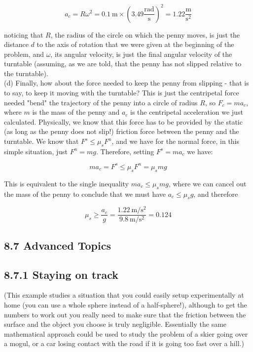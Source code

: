 \documentclass[10pt]{article}
\begin{document}
\begin{equation*}
a_{c}=R \omega^{2}=0.1 \mathrm{~m} \times\left(3.49 \frac{\mathrm{rad}}{\mathrm{s}}\right)^{2}=1.22 \frac{\mathrm{m}}{\mathrm{s}^{2}} \tag{8.43}
\end{equation*}


noticing that $R$, the radius of the circle on which the penny moves, is just the distance $d$ to the axis of rotation that we were given at the beginning of the problem, and $\omega$, its angular velocity, is just the final angular velocity of the turntable (assuming, as we are told, that the penny has not slipped relative to the turntable).\\
(d) Finally, how about the force needed to keep the penny from slipping - that is to say, to keep it moving with the turntable? This is just the centripetal force needed "bend" the trajectory of the penny into a circle of radius $R$, so $F_{c}=m a_{c}$, where $m$ is the mass of the penny and $a_{c}$ is the centripetal acceleration we just calculated. Physically, we know that this force has to be provided by the static (as long as the penny does not slip!) friction force between the penny and the turntable. We know that $F^{s} \leq \mu_{s} F^{n}$, and we have for the normal force, in this simple situation, just $F^{n}=m g$. Therefore, setting $F^{s}=m a_{c}$ we have:


\begin{equation*}
m a_{c}=F^{s} \leq \mu_{s} F^{n}=\mu_{s} m g \tag{8.44}
\end{equation*}


This is equivalent to the single inequality $m a_{c} \leq \mu_{s} m g$, where we can cancel out the mass of the penny to conclude that we must have $a_{c} \leq \mu_{s} g$, and therefore


\begin{equation*}
\mu_{s} \geq \frac{a_{c}}{g}=\frac{1.22 \mathrm{~m} / \mathrm{s}^{2}}{9.8 \mathrm{~m} / \mathrm{s}^{2}}=0.124 \tag{8.45}
\end{equation*}


\subsection*{8.7 Advanced Topics}
\subsection*{8.7.1 Staying on track}
(This example studies a situation that you could easily setup experimentally at home (you can use a whole sphere instead of a half-sphere!), although to get the numbers to work out you really need to make sure that the friction between the surface and the object you choose is truly negligible. Essentially the same mathematical approach could be used to study the problem of a skier going over a mogul, or a car losing contact with the road if it is going too fast over a hill.)
\end{document}
